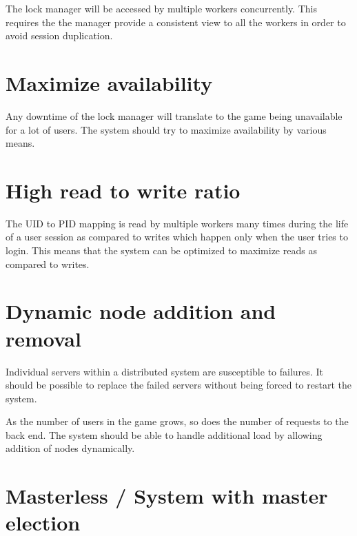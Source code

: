 The lock manager will be accessed by multiple workers concurrently. This
requires the the manager provide a consistent view to all the workers in
order to avoid session duplication.

\section{Maximize availability}


Any downtime of the lock manager will translate to the game being unavailable
for a lot of users. The system should try to maximize availability by various
means.

\section{High read to write ratio}
\label{section:req.read.write.ratio}


The UID to PID mapping is read by multiple workers many times during the life
of a user session as compared to writes which happen only when the user tries
to login. This means that the system can be optimized to maximize reads as
compared to writes.

\section{Dynamic node addition and removal}
\label{section:req.dynamic.cluster}


Individual servers within a distributed system are susceptible to failures.
It should be possible to replace the failed servers without being forced
to restart the system.

As the number of users in the game grows, so does the number of requests to
the back end. The system should be able to handle additional load by allowing
addition of nodes dynamically.


\section{Masterless / System with master election}


